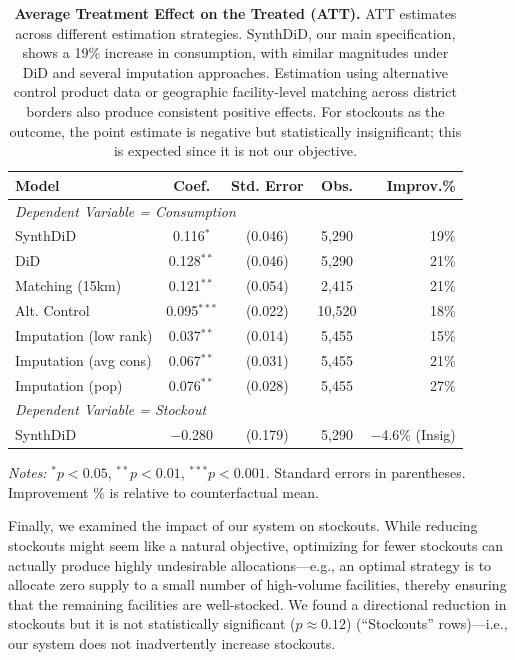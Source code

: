\documentclass[12pt]{article}
\begin{document}
\begin{table}[t]
\centering
\caption{\textbf{Average Treatment Effect on the Treated (ATT).} ATT estimates across different estimation strategies. SynthDiD, our main specification, shows a 19\% increase in consumption, with similar magnitudes under DiD and several imputation approaches. Estimation using alternative control product data or geographic facility-level matching across district borders also produce consistent positive effects. For stockouts as the outcome, the point estimate is negative but statistically insignificant; this is expected since it is not our objective.}
\label{tab:att_tabular}
\begin{threeparttable}
\begin{tabular}{l c c c r}
\toprule
\textbf{Model} & \textbf{Coef.} & \textbf{Std. Error} & \textbf{Obs.} & \textbf{ Improv.\%} \\
\midrule
\multicolumn{5}{l}{\textit{Dependent Variable = Consumption}} \\
\midrule
SynthDiD & 0.116$^{*}$ & (0.046) & 5,290 & 19\% \\
DiD & 0.128$^{**}$ & (0.046) & 5,290 & 21\% \\
Matching (15km) & 0.121$^{**}$ & (0.054) & 2,415 & 21\% \\
Alt. Control & 0.095$^{***}$ & (0.022) & 10,520 & 18\% \\
Imputation (low rank) & 0.037$^{**}$ & (0.014) & 5,455 & 15\% \\
Imputation (avg cons) & 0.067$^{**}$ & (0.031) & 5,455 & 21\% \\
Imputation (pop) & 0.076$^{**}$ & (0.028) & 5,455 & 27\% \\
\midrule
\multicolumn{5}{l}{\textit{Dependent Variable = Stockout}} \\
\midrule
SynthDiD & $-$0.280 & (0.179) & 5,290 & $-$4.6\% (Insig) \\
\bottomrule
\end{tabular}
\begin{tablenotes}[flushleft]
\scriptsize
\item \textit{Notes:} $^{*} p < 0.05$, $^{**} p < 0.01$, $^{***} p < 0.001$. Standard errors in parentheses. Improvement \% is relative to counterfactual mean.
\end{tablenotes}
\end{threeparttable}
\end{table}

Finally, we examined the impact of our system on stockouts. While reducing stockouts might seem like a natural objective, optimizing for fewer stockouts can actually produce highly undesirable allocations---e.g., an optimal strategy is to allocate zero supply to a small number of high-volume facilities, thereby ensuring that the remaining facilities are well-stocked. We found a directional reduction in stockouts but it is not statistically significant ($p\approx0.12$) (``Stockouts'' rows)---i.e., our system does not inadvertently increase stockouts.
\end{document}
